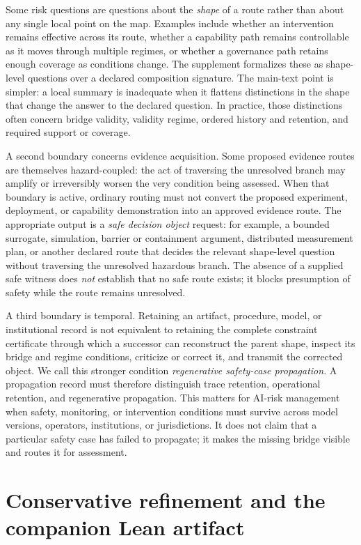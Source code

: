 \documentclass[11pt]{article}
\begin{document}
Some risk questions are questions about the \emph{shape} of a route rather than about any single local point on the map. Examples include whether an intervention remains effective across its route, whether a capability path remains controllable as it moves through multiple regimes, or whether a governance path retains enough coverage as conditions change. The supplement formalizes these as shape-level questions over a declared composition signature. The main-text point is simpler: a local summary is inadequate when it flattens distinctions in the shape that change the answer to the declared question. In practice, those distinctions often concern bridge validity, validity regime, ordered history and retention, and required support or coverage.

A second boundary concerns evidence acquisition. Some proposed evidence routes are themselves hazard-coupled: the act of traversing the unresolved branch may amplify or irreversibly worsen the very condition being assessed. When that boundary is active, ordinary routing must not convert the proposed experiment, deployment, or capability demonstration into an approved evidence route. The appropriate output is a \emph{safe decision object} request: for example, a bounded surrogate, simulation, barrier or containment argument, distributed measurement plan, or another declared route that decides the relevant shape-level question without traversing the unresolved hazardous branch. The absence of a supplied safe witness does \emph{not} establish that no safe route exists; it blocks presumption of safety while the route remains unresolved.

A third boundary is temporal. Retaining an artifact, procedure, model, or institutional record is not equivalent to retaining the complete constraint certificate through which a successor can reconstruct the parent shape, inspect its bridge and regime conditions, criticize or correct it, and transmit the corrected object. We call this stronger condition \emph{regenerative safety-case propagation}. A propagation record must therefore distinguish trace retention, operational retention, and regenerative propagation. This matters for AI-risk management when safety, monitoring, or intervention conditions must survive across model versions, operators, institutions, or jurisdictions. It does not claim that a particular safety case has failed to propagate; it makes the missing bridge visible and routes it for assessment.

\section{Conservative refinement and the companion Lean artifact}
\end{document}
